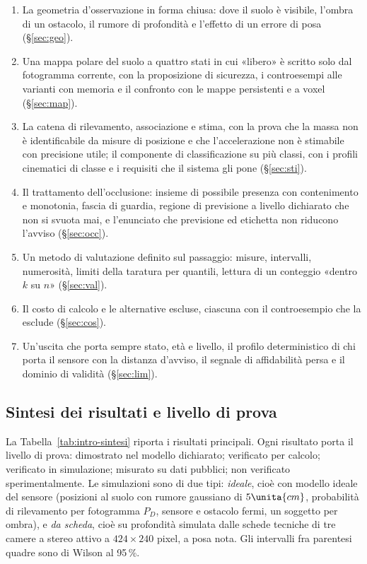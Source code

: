 \begin{enumerate}[label=\arabic*.]
\item La geometria d'osservazione in forma chiusa: dove il suolo è visibile, l'ombra di un ostacolo, il rumore di profondità e l'effetto di un errore di posa (\S\ref{sec:geo}).
\item Una mappa polare del suolo a quattro stati in cui «libero» è scritto solo dal fotogramma corrente, con la proposizione di sicurezza, i controesempi alle varianti con memoria e il confronto con le mappe persistenti e a voxel (\S\ref{sec:map}).
\item La catena di rilevamento, associazione e stima, con la prova che la massa non è identificabile da misure di posizione e che l'accelerazione non è stimabile con precisione utile; il componente di classificazione su più classi, con i profili cinematici di classe e i requisiti che il sistema gli pone (\S\ref{sec:sti}).
\item Il trattamento dell'occlusione: insieme di possibile presenza con contenimento e monotonia, fascia di guardia, regione di previsione a livello dichiarato che non si svuota mai, e l'enunciato che previsione ed etichetta non riducono l'avviso (\S\ref{sec:occ}).
\item Un metodo di valutazione definito sul passaggio: misure, intervalli, numerosità, limiti della taratura per quantili, lettura di un conteggio «dentro $k$ su $n$» (\S\ref{sec:val}).
\item Il costo di calcolo e le alternative escluse, ciascuna con il controesempio che la esclude (\S\ref{sec:cos}).
\item Un'uscita che porta sempre stato, età e livello, il profilo deterministico di chi porta il sensore con la distanza d'avviso, il segnale di affidabilità persa e il dominio di validità (\S\ref{sec:lim}).
\end{enumerate}

\subsection{Sintesi dei risultati e livello di prova}\label{sec:intro-sintesi}

La Tabella~\ref{tab:intro-sintesi} riporta i risultati principali. Ogni risultato porta il livello di prova:  dimostrato nel modello dichiarato;  verificato per calcolo;  verificato in simulazione;  misurato su dati pubblici;  non verificato sperimentalmente. Le simulazioni sono di due tipi: \emph{ideale}, cioè con modello ideale del sensore (posizioni al suolo con rumore gaussiano di $5\unita{cm}$, probabilità di rilevamento per fotogramma $P_D$, sensore e ostacolo fermi, un soggetto per ombra), e \emph{da scheda}, cioè su profondità simulata dalle schede tecniche di tre camere a stereo attivo a $424\times240$ pixel, a posa nota. Gli intervalli fra parentesi quadre sono di Wilson al 95\,\%.

